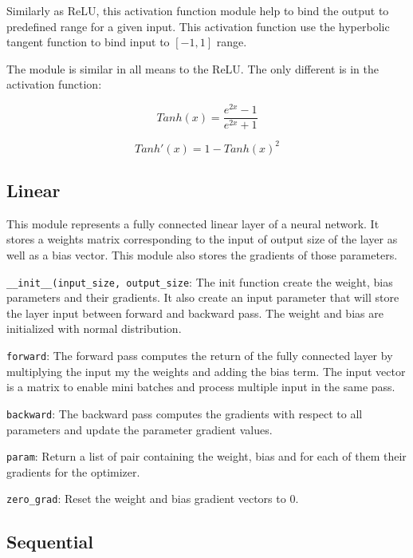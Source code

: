 \documentclass[10pt,conference,compsocconf]{IEEEtran}
\begin{document}
Similarly as ReLU, this activation function module help to bind the output to predefined range for a given input. This activation function use the hyperbolic tangent function to bind input to $[-1,1]$ range.

The module is similar in all means to the ReLU. The only different is in the activation function:


\begin{equation}
    Tanh(x) = \frac{e^{2x} - 1}{e^{2x} + 1}
\end{equation}



\begin{equation}
    Tanh'(x) = 1 - Tanh(x)^2
\end{equation}

\subsection{Linear}

This module represents a fully connected linear layer of a neural network. It stores a weights matrix corresponding to the input of output size of the layer as well as a bias vector. This module also stores the gradients of those parameters. 

\texttt{\_\_init\_\_(input\_size, output\_size}: The init function create the weight, bias parameters and their gradients. It also create an input parameter that will store the layer input between forward and backward pass. The weight and bias are initialized with normal distribution. 

\texttt{forward}: The forward pass computes the return of the fully connected layer by multiplying the input my the weights and adding the bias term. The input vector is a matrix to enable mini batches and process multiple input in the same pass.

\texttt{backward}: The backward pass computes the gradients with respect to all parameters and update the parameter gradient values. 

\texttt{param}: Return a list of pair containing the weight, bias and for each of them their gradients for the optimizer. 

\texttt{zero\_grad}: Reset the weight and bias gradient vectors to 0.

\subsection{Sequential}
\end{document}
